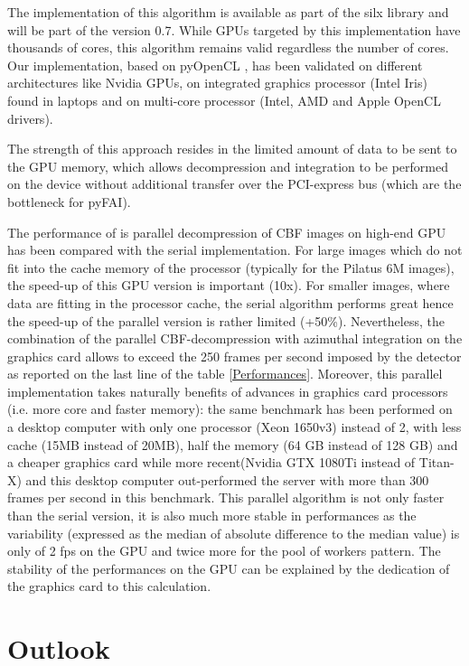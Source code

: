 \documentclass[preprint]{iucr}              %
\begin{document}
The implementation of this algorithm is available as part of the silx
\cite{silx} library and will be part of the version 0.7.
While GPUs targeted by this implementation have thousands of
cores, this algorithm remains valid regardless the
number of cores.
Our implementation, based on pyOpenCL \cite{pyopencl}, 
has been validated on different architectures like Nvidia GPUs, on 
integrated graphics processor (Intel Iris) found in laptops and on multi-core
processor (Intel, AMD and Apple OpenCL drivers). 

The strength of this approach resides in the limited amount of
data to be sent to the GPU memory, which allows decompression and
integration to be performed on the device without additional
transfer over the PCI-express bus (which are the bottleneck for pyFAI).

The performance of is parallel decompression of CBF images on high-end GPU has
been compared with the serial implementation. 
For large images which do not fit into the cache memory of the
processor (typically for the Pilatus 6M images), the speed-up of this GPU
version is important (10x).
For smaller images, where data are fitting in the processor cache, the serial
algorithm performs great hence the speed-up of the parallel version is
rather limited (+50\%). 
Nevertheless, the combination of the parallel CBF-decompression with azimuthal
integration on the graphics card allows to exceed the 250 frames per second
imposed by the detector as reported on the last line of the table
\ref{Performances}.
Moreover, this parallel implementation takes naturally benefits of advances in
graphics card processors (i.e. more core and faster memory): 
the same benchmark has been performed on a desktop computer with only one
processor (Xeon 1650v3) instead of 2, with less cache (15MB instead of 20MB),
half the memory (64 GB instead of 128 GB) and a cheaper graphics card while more
recent(Nvidia GTX 1080Ti instead of Titan-X) and this desktop computer
out-performed the server with more than 300 frames per second in this benchmark.
This parallel algorithm is not only faster than the serial version, it is also
much more stable in performances as the variability (expressed
as the median of absolute difference to the median value) is only of 2 fps on 
the GPU and twice more for the pool of workers pattern. 
The stability of the performances on the GPU can be explained by the dedication
of the graphics card to this calculation.

\section{Outlook}
\end{document}
